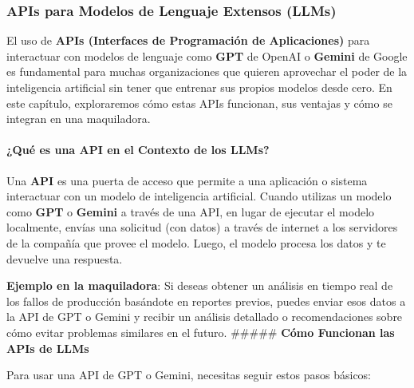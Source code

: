 \documentclass[
  10pt,
  letterpaper,
]{book}
\let\oldparagraph\paragraph
\renewcommand{\paragraph}[1]{\oldparagraph{#1}\mbox{}}
\begin{document}
\subsubsection{APIs para Modelos de Lenguaje Extensos
(LLMs)}\label{apis-para-modelos-de-lenguaje-extensos-llms}

El uso de \textbf{APIs (Interfaces de Programación de Aplicaciones)}
para interactuar con modelos de lenguaje como \textbf{GPT} de OpenAI o
\textbf{Gemini} de Google es fundamental para muchas organizaciones que
quieren aprovechar el poder de la inteligencia artificial sin tener que
entrenar sus propios modelos desde cero. En este capítulo, exploraremos
cómo estas APIs funcionan, sus ventajas y cómo se integran en una
maquiladora.

\paragraph{\texorpdfstring{\textbf{¿Qué es una API en el Contexto de los
LLMs?}}{¿Qué es una API en el Contexto de los LLMs?}}\label{quuxe9-es-una-api-en-el-contexto-de-los-llms}

Una \textbf{API} es una puerta de acceso que permite a una aplicación o
sistema interactuar con un modelo de inteligencia artificial. Cuando
utilizas un modelo como \textbf{GPT} o \textbf{Gemini} a través de una
API, en lugar de ejecutar el modelo localmente, envías una solicitud
(con datos) a través de internet a los servidores de la compañía que
provee el modelo. Luego, el modelo procesa los datos y te devuelve una
respuesta.

\textbf{Ejemplo en la maquiladora}: Si deseas obtener un análisis en
tiempo real de los fallos de producción basándote en reportes previos,
puedes enviar esos datos a la API de GPT o Gemini y recibir un análisis
detallado o recomendaciones sobre cómo evitar problemas similares en el
futuro. \#\#\#\#\# \textbf{Cómo Funcionan las APIs de LLMs}

Para usar una API de GPT o Gemini, necesitas seguir estos pasos básicos:
\end{document}
